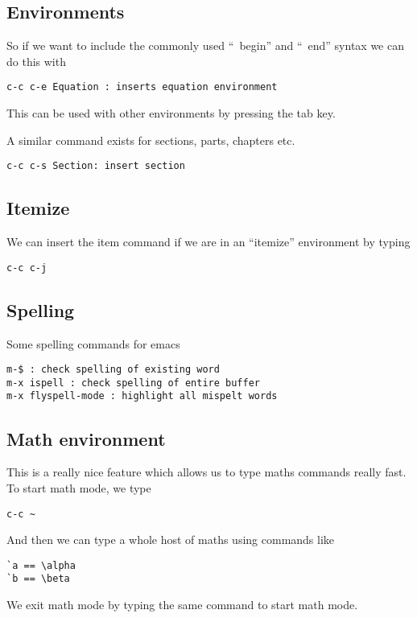 \documentclass[a4paper, 10pt]{article}
\begin{document}
\subsection*{Environments}

So if we want to include the commonly used ``\ begin{}'' and ``\ end{}'' syntax we can do this with 
\begin{verbatim}
c-c c-e Equation : inserts equation environment
\end{verbatim}
This can be used with other environments by pressing the tab key.

A similar command exists for sections, parts, chapters etc.
\begin{verbatim}
c-c c-s Section: insert section  
\end{verbatim}

\subsection{Itemize}
\label{sec:itemize}


We can insert the item command if we are in an ``itemize'' environment
by typing
\begin{verbatim}
c-c c-j
\end{verbatim}


\subsection{Spelling}
\label{sec:spelling}

Some spelling commands for emacs
\begin{verbatim}
m-$ : check spelling of existing word
m-x ispell : check spelling of entire buffer
m-x flyspell-mode : highlight all mispelt words
\end{verbatim}

\subsection*{Math environment}
This is a really nice feature which allows us to type maths commands really fast. To start math mode, we type
\begin{verbatim}
c-c ~
\end{verbatim}
And then we can type a whole host of maths using commands like
\begin{verbatim}
`a == \alpha
`b == \beta
\end{verbatim}

We exit math mode by typing the same command to start math mode.
\end{document}
